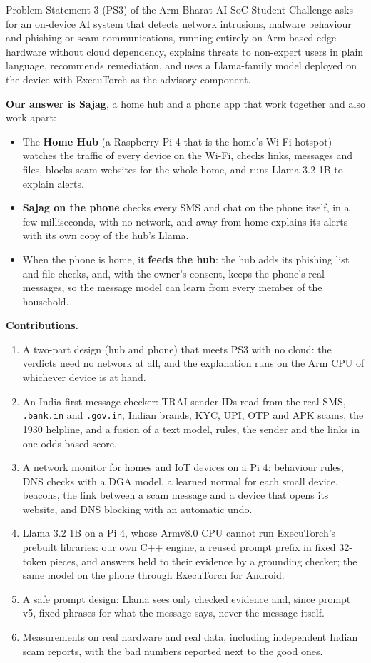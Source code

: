 \documentclass[11pt,a4paper]{article}
\newcommand{\code}[1]{\texttt{#1}}
\begin{document}
Problem Statement 3 (PS3) of the Arm Bharat AI-SoC Student Challenge asks for an on-device AI system that
detects network intrusions, malware behaviour and phishing or scam communications, running entirely on
Arm-based edge hardware without cloud dependency, explains threats to non-expert users in plain language,
recommends remediation, and uses a Llama-family model deployed on the device with ExecuTorch as the
advisory component.

\textbf{Our answer is Sajag}, a home hub and a phone app that work together and also work apart:

\begin{itemize}
  \item The \textbf{Home Hub} (a Raspberry Pi 4 that is the home's Wi-Fi hotspot) watches the traffic of every
        device on the Wi-Fi, checks links, messages and files, blocks scam websites for the whole home, and runs
        Llama 3.2 1B to explain alerts.
  \item \textbf{Sajag on the phone} checks every SMS and chat on the phone itself, in a few milliseconds, with no
        network, and away from home explains its alerts with its own copy of the hub's Llama.
  \item When the phone is home, it \textbf{feeds the hub}: the hub adds its phishing list and file checks, and,
        with the owner's consent, keeps the phone's real messages, so the message model can learn from every
        member of the household.
\end{itemize}

\textbf{Contributions.}
\begin{enumerate}
  \item A two-part design (hub and phone) that meets PS3 with no cloud: the verdicts need no network at all,
        and the explanation runs on the Arm CPU of whichever device is at hand.
  \item An India-first message checker: TRAI sender IDs read from the real SMS, \code{.bank.in} and
        \code{.gov.in}, Indian brands, KYC, UPI, OTP and APK scams, the 1930 helpline, and a fusion of a text
        model, rules, the sender and the links in one odds-based score.
  \item A network monitor for homes and IoT devices on a Pi 4: behaviour rules, DNS checks with a DGA model,
        a learned normal for each small device, beacons, the link between a scam message and a device that
        opens its website, and DNS blocking with an automatic undo.
  \item Llama 3.2 1B on a Pi 4, whose Armv8.0 CPU cannot run ExecuTorch's prebuilt libraries: our own C++
        engine, a reused prompt prefix in fixed 32-token pieces, and answers held to their evidence by a
        grounding checker; the same model on the phone through ExecuTorch for Android.
  \item A safe prompt design: Llama sees only checked evidence and, since prompt v5, fixed phrases for what
        the message says, never the message itself.
  \item Measurements on real hardware and real data, including independent Indian scam reports, with the bad
        numbers reported next to the good ones.
\end{enumerate}
\end{document}
